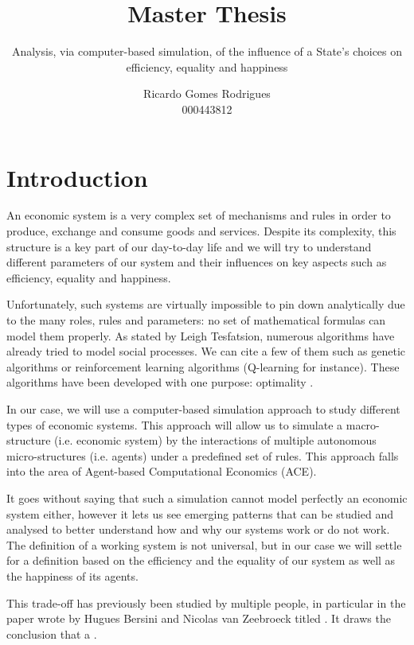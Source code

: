 \documentclass[20pt]{article}
\title{Master Thesis}
\subtitle{Analysis, via computer-based simulation, of the influence of a State's choices on efficiency, equality and happiness}
\author{Ricardo Gomes Rodrigues\\000443812}
\begin{document}
\maketitle
\newpage

\tableofcontents
\newpage


\section{Introduction}

An economic system is a very complex set of mechanisms and rules in order to produce, exchange and consume goods and services. Despite its complexity, this structure is a key part of our day-to-day life and we will try to understand different parameters of our system and their influences on key aspects such as efficiency, equality and happiness.

Unfortunately, such systems are virtually impossible to pin down analytically due to the many roles, rules and parameters: no set of mathematical formulas can model them properly. %
As stated by Leigh Tesfatsion, numerous algorithms have already tried to model social processes. We can cite a few of them such as genetic algorithms or reinforcement learning algorithms (Q-learning for instance). These algorithms have been developed with one purpose: optimality \cite{tesfatsion_bottom_up}.

In our case, we will use a computer-based simulation approach to study different types of economic systems. This approach will allow us to simulate a macro-structure (i.e. economic system) by the interactions of multiple autonomous micro-structures (i.e. agents) under a predefined set of rules. This approach falls into the area of Agent-based Computational Economics (ACE).

It goes without saying that such a simulation cannot model perfectly an economic system either, however it lets us see emerging patterns that can be studied and analysed to better understand how and why our systems work or do not work. The definition of a working system is not universal, but in our case we will settle for a definition based on the efficiency and the equality of our system as well as the happiness of its agents. 

This trade-off has previously been studied by multiple people, in particular in the paper wrote by Hugues Bersini and Nicolas van Zeebroeck titled  \cite{bersini}. It draws the conclusion that a .
\end{document}
